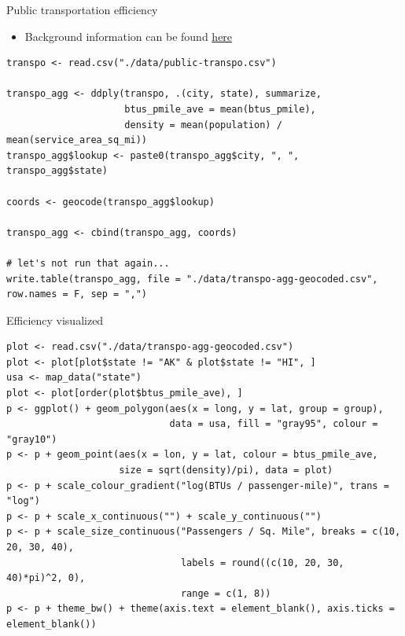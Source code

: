 \documentclass[sans,aspectratio=169,presentation,bigger,fleqn]{beamer}
\begin{document}
\begin{frame}[fragile,label=sec-28]{Public transportation efficiency}
 \begin{itemize}
\item Background information can be found \href{https://github.com/tcrug/public-transpo}{here}
\end{itemize}

\scriptsize

\begin{verbatim}
transpo <- read.csv("./data/public-transpo.csv")

transpo_agg <- ddply(transpo, .(city, state), summarize,
                     btus_pmile_ave = mean(btus_pmile),
                     density = mean(population) / mean(service_area_sq_mi))
transpo_agg$lookup <- paste0(transpo_agg$city, ", ", transpo_agg$state)

coords <- geocode(transpo_agg$lookup)

transpo_agg <- cbind(transpo_agg, coords)

# let's not run that again...
write.table(transpo_agg, file = "./data/transpo-agg-geocoded.csv", row.names = F, sep = ",")
\end{verbatim}
\normalsize
\end{frame}
\begin{frame}[fragile,label=sec-29]{Efficiency visualized}
 \scriptsize

\begin{verbatim}
plot <- read.csv("./data/transpo-agg-geocoded.csv")
plot <- plot[plot$state != "AK" & plot$state != "HI", ]
usa <- map_data("state")
plot <- plot[order(plot$btus_pmile_ave), ]
p <- ggplot() + geom_polygon(aes(x = long, y = lat, group = group),
                             data = usa, fill = "gray95", colour = "gray10")
p <- p + geom_point(aes(x = lon, y = lat, colour = btus_pmile_ave,
                    size = sqrt(density)/pi), data = plot)
p <- p + scale_colour_gradient("log(BTUs / passenger-mile)", trans = "log")
p <- p + scale_x_continuous("") + scale_y_continuous("")
p <- p + scale_size_continuous("Passengers / Sq. Mile", breaks = c(10, 20, 30, 40),
                               labels = round((c(10, 20, 30, 40)*pi)^2, 0),
                               range = c(1, 8))
p <- p + theme_bw() + theme(axis.text = element_blank(), axis.ticks = element_blank())
\end{verbatim}

\normalsize
\end{frame}
\end{document}
